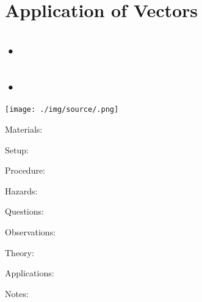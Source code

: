 \section{Application of Vectors}

\begin{multicols}{2}


\section*{•}




\subsection{•}

\begin{center}
\texttt{[image: ./img/source/.png]}
\end{center}

\begin{description*}
\item[Materials:]{}
\item[Setup:]{}
\item[Procedure:]{}
\item[Hazards:]{}
\item[Questions:]{}
\item[Observations:]{}
\item[Theory:]{}
\item[Applications:]{}
\item[Notes:]{}
\end{description*}



\end{multicols}

\pagebreak